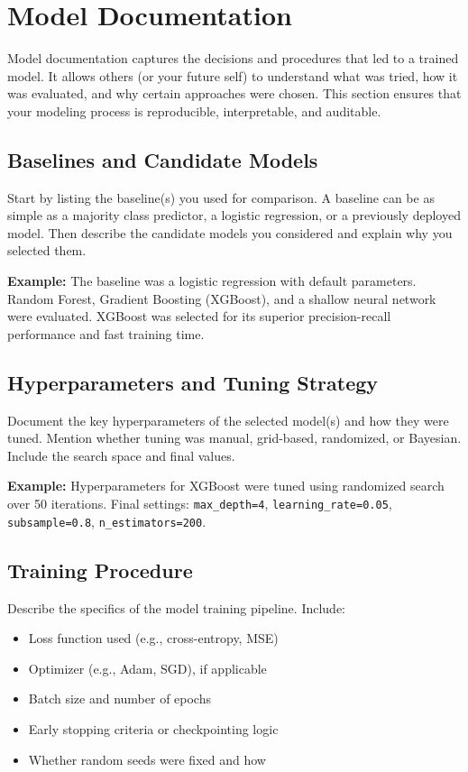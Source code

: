 \documentclass[12pt,openany]{book}
\begin{document}
\section{Model Documentation}

Model documentation captures the decisions and procedures that led to a trained model. It allows others (or your future self) to understand what was tried, how it was evaluated, and why certain approaches were chosen. This section ensures that your modeling process is reproducible, interpretable, and auditable.

\subsection{Baselines and Candidate Models}

Start by listing the baseline(s) you used for comparison. A baseline can be as simple as a majority class predictor, a logistic regression, or a previously deployed model. Then describe the candidate models you considered and explain why you selected them.

\textbf{Example:} The baseline was a logistic regression with default parameters. Random Forest, Gradient Boosting (XGBoost), and a shallow neural network were evaluated. XGBoost was selected for its superior precision-recall performance and fast training time.

\subsection{Hyperparameters and Tuning Strategy}

Document the key hyperparameters of the selected model(s) and how they were tuned. Mention whether tuning was manual, grid-based, randomized, or Bayesian. Include the search space and final values.

\textbf{Example:} Hyperparameters for XGBoost were tuned using randomized search over 50 iterations. Final settings: \texttt{max\_depth=4}, \texttt{learning\_rate=0.05}, \texttt{subsample=0.8}, \texttt{n\_estimators=200}.

\subsection{Training Procedure}

Describe the specifics of the model training pipeline. Include:
\begin{itemize}
    \item Loss function used (e.g., cross-entropy, MSE)
    \item Optimizer (e.g., Adam, SGD), if applicable
    \item Batch size and number of epochs
    \item Early stopping criteria or checkpointing logic
    \item Whether random seeds were fixed and how
\end{itemize}
\end{document}
